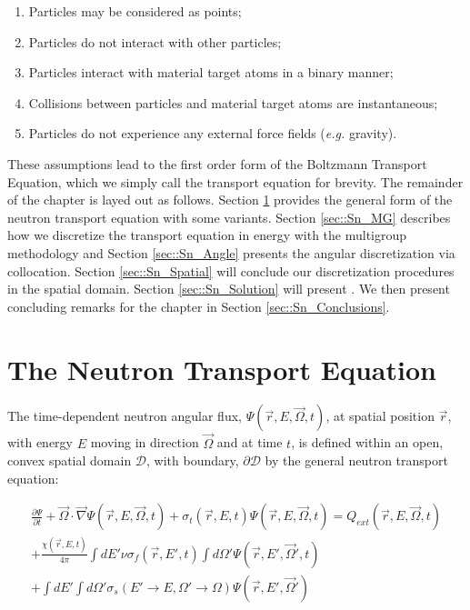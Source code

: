 \begin{enumerate}
	\item Particles may be considered as points;
	\item Particles do not interact with other particles;
	\item Particles interact with material target atoms in a binary manner;
	\item Collisions between particles and material target atoms are instantaneous;
	\item Particles do not experience any external force fields ({\em e.g.} gravity).
\end{enumerate}

These assumptions lead to the first order form of the Boltzmann Transport Equation, which we simply call the transport equation for brevity. The remainder of the chapter is layed out as follows. Section \ref{sec::Sn_neut} provides the general form of the neutron transport equation with some variants. Section \ref{sec::Sn_MG} describes how we discretize the transport equation in energy with the multigroup methodology and Section \ref{sec::Sn_Angle} presents the angular discretization via collocation. Section \ref{sec::Sn_Spatial} will conclude our discretization procedures in the spatial domain. Section \ref{sec::Sn_Solution} will present . We then present concluding remarks for the chapter in Section \ref{sec::Sn_Conclusions}.

\section{The Neutron Transport Equation}
\label{sec::Sn_neut}

The time-dependent neutron angular flux, $\Psi (\vec{r}, E, \vec{\Omega}, t)$, at spatial position $\vec{r}$, with energy $E$ moving in direction $\vec{\Omega}$ and at time $t$, is defined within an open, convex spatial domain $\mathcal{D}$, with boundary, $\partial \mathcal{D}$ by the general neutron transport equation:


\begin{equation}
\label{eq::Sn_transport_eq_full}
\begin{aligned}
	\frac{\partial \Psi}{\partial t} + \vec{\Omega} \cdot \vec{\nabla} \Psi (\vec{r}, E, \vec{\Omega},t)+ \sigma_t (\vec{r}, E,t) \Psi (\vec{r}, E, \vec{\Omega},t) =Q_{ext} (\vec{r}, E, \vec{\Omega},t) \\
	+ \frac{\chi (\vec{r}, E,t)}{4 \pi} \int dE' \nu \sigma_f (\vec{r}, E',t) \int d\Omega' \Psi (\vec{r}, E', \vec{\Omega}',t) \\ 
	+ \int dE' \int d\Omega' \sigma_s (E' \rightarrow E, \Omega' \rightarrow \Omega) \Psi (\vec{r}, E', \vec{\Omega}')
\end{aligned}
\end{equation}

